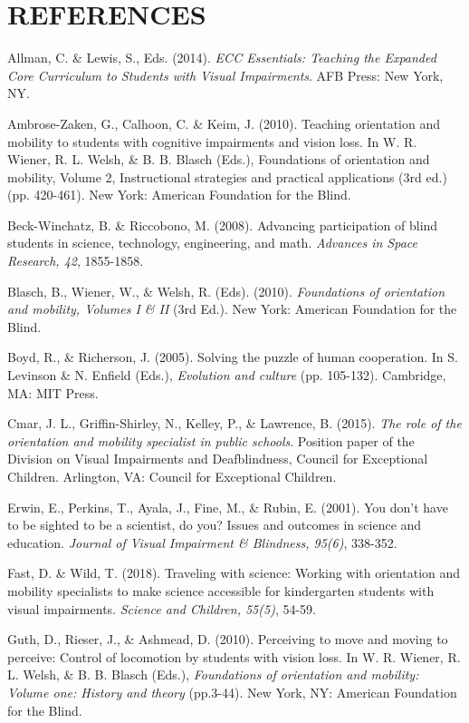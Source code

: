 \documentclass[11.5pt]{sig-alternate} %
\begin{document}
\section*{REFERENCES}\par 

\leftskip 0.25in
\parindent -0.25in 

Allman, C. \& Lewis, S., Eds. (2014). \textit{ECC Essentials: Teaching the Expanded Core Curriculum to Students with Visual Impairments}. AFB Press:  New York, NY.

Ambrose-Zaken, G., Calhoon, C. \& Keim, J. (2010). Teaching orientation and mobility to students with cognitive impairments and vision loss.  In W. R. Wiener, R. L. Welsh, \& B. B. Blasch (Eds.), Foundations of orientation and mobility, Volume 2, Instructional strategies and practical applications (3rd ed.) (pp. 420-461). New York:  American Foundation for the Blind.

Beck-Winchatz, B. \& Riccobono, M. (2008). Advancing participation of blind students in science, technology, engineering, and math. \textit{Advances in Space Research, 42}, 1855-1858.

Blasch, B., Wiener, W., \& Welsh, R. (Eds). (2010). \textit{Foundations of orientation and mobility, Volumes I \& II} (3rd Ed.). New York:  American Foundation for the Blind.

Boyd, R., \& Richerson, J. (2005). Solving the puzzle of human cooperation. In S. Levinson \& N. Enfield (Eds.), \textit{Evolution and culture} (pp. 105-132). Cambridge, MA: MIT Press.

Cmar, J. L., Griffin-Shirley, N., Kelley, P., \& Lawrence, B. (2015). \textit{The role of the orientation and mobility specialist in public schools}.  Position paper of the Division on Visual Impairments and Deafblindness, Council for Exceptional Children. Arlington, VA:  Council for Exceptional Children.

Erwin, E., Perkins, T., Ayala, J., Fine, M., \& Rubin, E. (2001). You don’t have to be sighted to be a scientist, do you? Issues and outcomes in science and education.  \textit{Journal of Visual Impairment \& Blindness, 95(6)}, 338-352.

Fast, D. \& Wild, T. (2018). Traveling with science:  Working with orientation and mobility specialists to make science accessible for kindergarten students with visual impairments.  \textit{Science and Children, 55(5)}, 54-59.

Guth, D., Rieser, J., \& Ashmead, D. (2010). Perceiving to move and moving to perceive:  Control of locomotion by students with vision loss.  In W. R. Wiener, R. L. Welsh, \& B. B. Blasch 	(Eds.), \textit{Foundations of orientation and mobility:  Volume one:  History and theory} (pp.3-44).  New York, NY:  American Foundation for the Blind.
\end{document}
